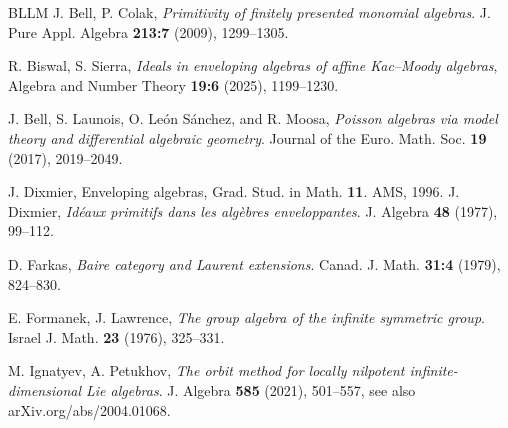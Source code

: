 \documentclass{amsart} \textwidth=18.0cm \oddsidemargin=-1cm \evensidemargin=-1cm \topmargin=-1cm \textheight=23cm
\theoremstyle{definition}
\begin{document}
\begin{thebibliography}{BLLM}
 J. Bell, P. Colak, {\em Primitivity of finitely presented monomial algebras}. J. Pure
Appl. Algebra {\bf 213:7} (2009), 1299–1305.

 R. Biswal, S. Sierra, {\em Ideals in enveloping algebras of affine Kac–Moody algebras}, Algebra and Number Theory {\bf 19:6} (2025), 1199--1230.

 J. Bell, S. Launois, O. Le\'on S\'anchez, and R. Moosa, {\em Poisson algebras via model theory and differential algebraic geometry}. Journal of the Euro. Math. Soc. {\bf 19} (2017), 2019--2049.

 J. Dixmier, Enveloping algebras, Grad. Stud. in Math. \textbf{11}. AMS, 1996. %
 J. Dixmier, {\em Id\'eaux primitifs dans les alg\`ebres enveloppantes}. J. Algebra {\bf 48} (1977), 99--112. 

 D. Farkas, {\em Baire category and Laurent extensions}. Canad. J. Math. {\bf 31:4} (1979), 824--830.

 E. Formanek, J. Lawrence, {\em The group algebra of the infinite symmetric group}. Israel J. Math. {\bf 23} (1976), 325--331. 


 M. Ignatyev, A. Petukhov, {\em The orbit method for locally nilpotent infinite-dimensional Lie algebras}. J. Algebra {\bf 585} (2021), 501--557, see also arXiv.org/abs/2004.01068. 


\end{thebibliography}
\end{document}
